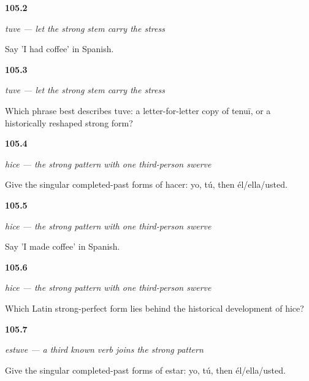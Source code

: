 \noindent\begin{minipage}[t]{\linewidth}
\raggedright
\hypertarget{review-ES-C15-tener-preterite-tuve-cafe}{\textbf{105.2}} \emph{tuve — let the strong stem carry the stress}\par
\small Say 'I had coffee' in Spanish.
\end{minipage}\par\medskip

\noindent\begin{minipage}[t]{\linewidth}
\raggedright
\hypertarget{review-ES-C15-tener-preterite-history}{\textbf{105.3}} \emph{tuve — let the strong stem carry the stress}\par
\small Which phrase best describes tuve: a letter-for-letter copy of tenuī, or a historically reshaped strong form?
\end{minipage}\par\medskip

\noindent\begin{minipage}[t]{\linewidth}
\raggedright
\hypertarget{review-ES-C15-hacer-preterite-singular-forms}{\textbf{105.4}} \emph{hice — the strong pattern with one third-person swerve}\par
\small Give the singular completed-past forms of hacer: yo, tú, then él/ella/usted.
\end{minipage}\par\medskip

\noindent\begin{minipage}[t]{\linewidth}
\raggedright
\hypertarget{review-ES-C15-hacer-preterite-hice-cafe}{\textbf{105.5}} \emph{hice — the strong pattern with one third-person swerve}\par
\small Say 'I made coffee' in Spanish.
\end{minipage}\par\medskip

\noindent\begin{minipage}[t]{\linewidth}
\raggedright
\hypertarget{review-ES-C15-hacer-preterite-history}{\textbf{105.6}} \emph{hice — the strong pattern with one third-person swerve}\par
\small Which Latin strong-perfect form lies behind the historical development of hice?
\end{minipage}\par\medskip

\noindent\begin{minipage}[t]{\linewidth}
\raggedright
\hypertarget{review-ES-C15-preterite-fuertes-estar-forms}{\textbf{105.7}} \emph{estuve — a third known verb joins the strong pattern}\par
\small Give the singular completed-past forms of estar: yo, tú, then él/ella/usted.
\end{minipage}\par\medskip

